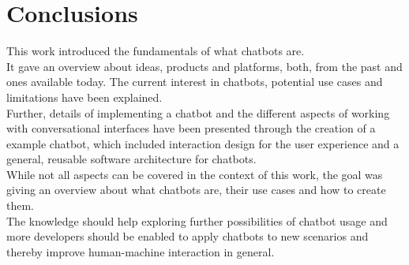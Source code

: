 \chapter{Conclusions}

This work introduced the fundamentals of what chatbots are.
\\
It gave an overview about ideas, products and platforms, both, from the past and ones available today.
The current interest in chatbots, potential use cases and limitations have been explained.
\\
Further, details of implementing a chatbot and the different aspects of working with conversational interfaces
have been presented through the creation of a example chatbot,
which included interaction design for the user experience and a general, reusable software architecture for chatbots.
\\

While not all aspects can be covered in the context of this work,
the goal was giving an overview about what chatbots are, their use cases and how to create them.
\\
The knowledge should help exploring further possibilities of chatbot
usage and more developers should be enabled to apply chatbots to new scenarios and thereby improve human-machine interaction in general.
